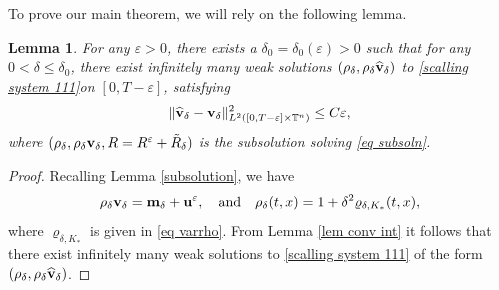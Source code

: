 \documentclass[12pt,reqno]{amsart}
\newtheorem{Lemma}{Lemma}[section]
\theoremstyle{definition}
\theoremstyle{remark}
\numberwithin{equation}{section}
\renewcommand{\u}{{\bf u}}
\renewcommand{\v}{{\bf v}}
\newcommand{\m}{{\bf m}}
\newcommand{\eps}{{\varepsilon}}
\begin{document}
To prove our main theorem, we will rely on the following lemma.
\begin{Lemma}
\label{global existence}
For any $\eps > 0$, there exists a $\delta_0 = \delta_0(\eps) > 0$ such that for any $0 < \delta \le \delta_0$, there exist infinitely many weak solutions $(\rho_{\delta},\rho_{\delta}\widehat{\v}_{\delta})$ to \eqref{scalling system 111}on $[0, T- \eps]$, satisfying  
$$
\|\widehat{\v}_{\delta} - \v_{\delta}\|_{L^2([0,T - \eps] \times \mathbb{T}^n)}^2\leq C \varepsilon,
$$
where $(\rho_\delta, \rho_\delta \v_\delta, R = R^\varepsilon + \tilde{R}_\delta)$ is the subsolution solving \eqref{eq subsoln}. 
\end{Lemma}
\begin{proof}
Recalling Lemma \ref{subsolution}, we have
\[
\rho_{\delta} \v_{\delta} = \m_{\delta} + \u^{\varepsilon}, \quad \text{and} \quad \rho_\delta(t,x) = 1 + \delta^2 \varrho_{\delta, K_\ast}(t,x), 
\]
where $\varrho_{\delta, K_\ast}$ is given in \eqref{eq varrho}. From Lemma \ref{lem conv int} it follows that there exist infinitely many weak solutions to \eqref{scalling system 111} of the form $({\rho}_{\delta}, {\rho}_{\delta} \widehat{\v}_{\delta})$.


\end{proof}
\end{document}
